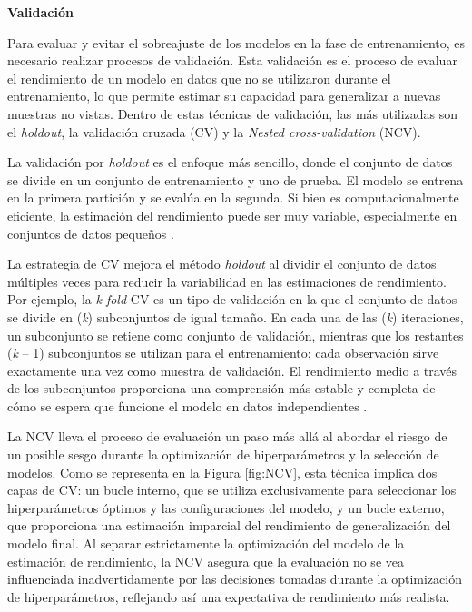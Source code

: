 \textbf{Validación}

Para evaluar y evitar el sobreajuste de los modelos en la fase de entrenamiento, es necesario realizar procesos de validación. Esta validación es el proceso de evaluar el rendimiento de un modelo en datos que no se utilizaron durante el entrenamiento, lo que permite estimar su capacidad para generalizar a nuevas muestras no vistas. Dentro de estas técnicas de validación, las más utilizadas son el \textit{holdout}, la validación cruzada (CV) y la \textit{Nested cross-validation} (NCV).

La validación por \textit{holdout} es el enfoque más sencillo, donde el conjunto de datos se divide en un conjunto de entrenamiento y uno de prueba. El modelo se entrena en la primera partición y se evalúa en la segunda. Si bien es computacionalmente eficiente, la estimación del rendimiento puede ser muy variable, especialmente en conjuntos de datos pequeños \cite{kohavi1995study}.

La estrategia de CV mejora el método \textit{holdout} al dividir el conjunto de datos múltiples veces para reducir la variabilidad en las estimaciones de rendimiento. Por ejemplo, la \textit{k-fold} CV es un tipo de validación en la que el conjunto de datos se divide en (\textit{k}) subconjuntos de igual tamaño. En cada una de las (\textit{k}) iteraciones, un subconjunto se retiene como conjunto de validación, mientras que los restantes (\textit{k} – 1) subconjuntos se utilizan para el entrenamiento; cada observación sirve exactamente una vez como muestra de validación. El rendimiento medio a través de los subconjuntos proporciona una comprensión más estable y completa de cómo se espera que funcione el modelo en datos independientes \cite{kohavi1995study}.

La NCV lleva el proceso de evaluación un paso más allá al abordar el riesgo de un posible sesgo durante la optimización de hiperparámetros y la selección de modelos. Como se  representa en la Figura \ref{fig:NCV}, esta técnica implica dos capas de CV: un bucle interno, que se utiliza exclusivamente para seleccionar los hiperparámetros óptimos y las configuraciones del modelo, y un bucle externo, que proporciona una estimación imparcial del rendimiento de generalización del modelo final. Al separar estrictamente la optimización del modelo de la estimación de rendimiento, la NCV asegura que la evaluación no se vea influenciada inadvertidamente por las decisiones tomadas durante la optimización de hiperparámetros, reflejando así una expectativa de rendimiento más realista.

